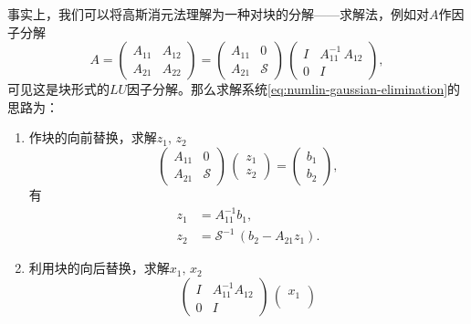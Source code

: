 \begin{subappendices}
事实上，我们可以将高斯消元法理解为一种对块的分解——求解法，例如对$A$作因子分解
\begin{equation*}
  A =
  \begin{pmatrix}
    A_{11} & A_{12} \\
    A_{21} & A_{22}
  \end{pmatrix}
  = \begin{pmatrix}
  A_{11} & 0 \\
  A_{21} & \mathcal{S}
  \end{pmatrix}
  \,
  \begin{pmatrix}
    I & A_{11}^{-1} \, A_{12} \\
    0 & I
  \end{pmatrix},
\end{equation*}
可见这是块形式的$LU$因子分解。那么求解系统\eqref{eq:numlin-gaussian-elimination}的思路为：
\begin{enumerate}
  \item 作块的向前替换，求解$z_{1}, \, z_{2}$
  \begin{equation*}
    \begin{pmatrix}
    A_{11} & 0 \\
    A_{21} & \mathcal{S}
    \end{pmatrix}
    \,
    \begin{pmatrix}
      z_{1} \\
      z_{2}
    \end{pmatrix}
    =
    \begin{pmatrix}
      b_{1} \\
      b_{2}
    \end{pmatrix},
  \end{equation*}
  有
  \begin{equation*}
    \begin{split}
      z_{1} & = A_{11}^{-1} b_{1}, \\
      z_{2} & = \mathcal{S}^{-1} \, \left( b_{2} - A_{21} z_{1} \right).
    \end{split}
  \end{equation*}
  \item 利用块的向后替换，求解$x_{1}, \, x_{2}$
  \begin{equation*}
    \begin{pmatrix}
      I & A_{11}^{-1} A_{12} \\
      0 & I
    \end{pmatrix}
    \,
    \begin{pmatrix}
      x_{1} \\

\end{pmatrix}
\end{equation*}
\end{enumerate}
\end{subappendices}
